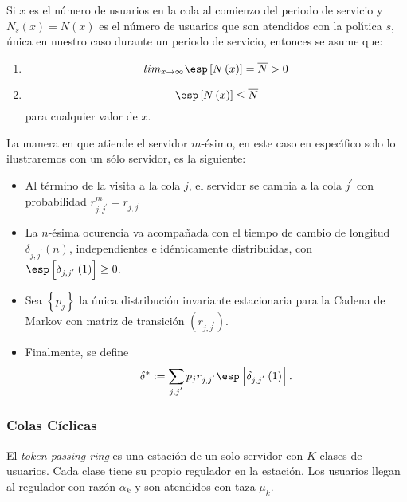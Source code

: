 Si $x$ es el n{\'u}mero de usuarios en la cola al comienzo del
periodo de servicio y $N_{s}\left(x\right)=N\left(x\right)$ es el
n{\'u}mero de usuarios que son atendidos con la pol{\'\i}tica $s$,
{\'u}nica en nuestro caso durante un periodo de servicio, entonces
se asume que:
\begin{enumerate}
\item
\begin{equation}\label{S1}
lim_{x\rightarrow\infty}\esp\left[N\left(x\right)\right]=\overline{N}>0
\end{equation}
\item
\begin{equation}\label{S2}
\esp\left[N\left(x\right)\right]\leq \overline{N} \end{equation}
para cualquier valor de $x$.
\end{enumerate}
La manera en que atiende el servidor $m$-{\'e}simo, en este caso
en espec{\'\i}fico solo lo ilustraremos con un s{\'o}lo servidor,
es la siguiente:
\begin{itemize}
\item Al t{\'e}rmino de la visita a la cola $j$, el servidor se
cambia a la cola $j^{'}$ con probabilidad
$r_{j,j^{'}}^{m}=r_{j,j^{'}}$

\item La $n$-{\'e}sima ocurencia va acompa{\~n}ada con el tiempo
de cambio de longitud $\delta_{j,j^{'}}\left(n\right)$,
independientes e id{\'e}nticamente distribuidas, con
$\esp\left[\delta_{j,j^{'}}\left(1\right)\right]\geq0$.

\item Sea $\left\{p_{j}\right\}$ la {\'u}nica distribuci{\'o}n
invariante estacionaria para la Cadena de Markov con matriz de
transici{\'o}n $\left(r_{j,j^{'}}\right)$.

\item Finalmente, se define
\begin{equation}
\delta^{*}:=\sum_{j,j^{'}}p_{j}r_{j,j^{'}}\esp\left[\delta_{j,j^{'}}\left(1\right)\right].
\end{equation}
\end{itemize}
\subsubsection{Colas C\'iclicas}
El {\em token passing ring} es una estaci\'on de un solo servidor
con $K$ clases de usuarios. Cada clase tiene su propio regulador
en la estaci\'on. Los usuarios llegan al regulador con raz\'on
$\alpha_{k}$ y son atendidos con taza $\mu_{k}$.

